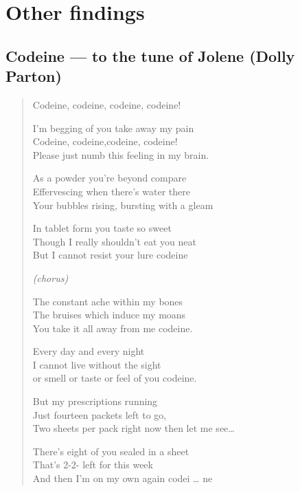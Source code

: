 \section{Other findings}


	\subsection{Codeine --- to the tune of Jolene (Dolly Parton)}
		
		\begin{verse}
			\begin{centering}
				Codeine, codeine, codeine, codeine!
				
				
				I’m begging of you take away my pain\\
				Codeine, codeine,codeine, codeine!\\
				Please just numb this feeling in my brain.
				
				
				As a powder you’re beyond compare\\
				Effervescing when there’s water there\\
				Your bubbles rising, bursting with a gleam
				
				
				In tablet form you taste so sweet\\
				Though I really shouldn’t eat you neat\\
				But I cannot resist your lure codeine
				
				
				\emph{(chorus)}
				
				
				The constant ache within my bones\\
				The bruises which induce my moans\\
				You take it all away from me codeine.
				
				
				Every day and every night\\
				I cannot live without the sight\\
				or smell or taste or feel of you codeine.
				
				
				But my prescriptions running\\
				Just fourteen packets left to go,\\
				Two sheets per pack right now then let me see…
				
				
				There’s eight of you sealed in a sheet\\
				That’s 2-2- left for this week\\
				And then I’m on my own again codei … ne
				
			\end{centering}
		\end{verse}



